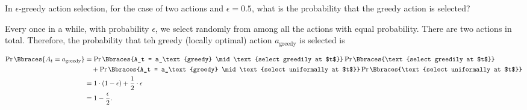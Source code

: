 
\begin{exercise}[Exercise 2.1]

In $\epsilon$-greedy action selection, for the case of two actions and $\epsilon = 0.5$, what is the probability that the greedy action is selected?

\end{exercise}


\begin{solution}

Every once in a while, with probability $\epsilon$, we select randomly from among all the actions with equal probability.
There are two actions in total.
Therefore, the probability that teh greedy (locally optimal) action $a_\text{greedy}$ is selected is

\begin{align*}
    \Pr \Bbraces{A_t = a_\text{greedy}}
    & =
    \Pr \Bbraces{A_t = a_\text{greedy} \mid \text{select greedily at $t$}} \Pr \Bbraces{\text{select greedily at $t$}} \\
    & \quad +
    \Pr \Bbraces{A_t = a_\text{greedy} \mid \text{select uniformally at $t$}} \Pr \Bbraces{\text{select uniformally at $t$}} \\
    & =
    1 \cdot (1 - \epsilon) + \frac{1}{2} \cdot \epsilon \\
    & =
    1 - \frac{\epsilon}{2}.
\end{align*}

\end{solution}


